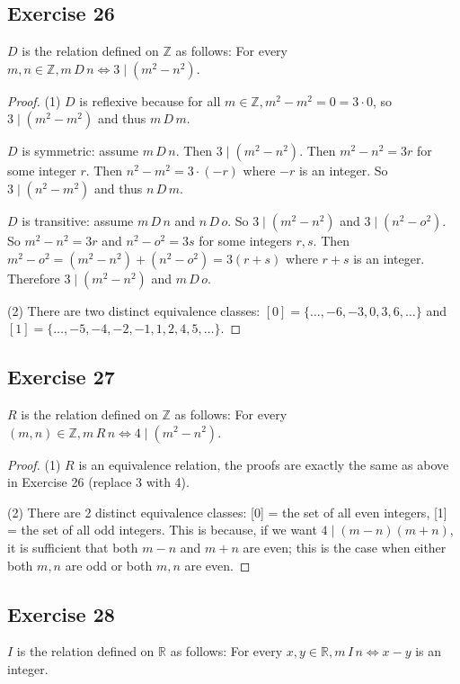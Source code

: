 \documentclass[14pt]{extarticle}
\newcommand{\R}{\mathbb{R}}
\newcommand{\Z}{\mathbb{Z}}
\begin{document}
\subsection{Exercise 26}
$D$ is the relation defined on \(\Z\) as follows: For every \(m, n \in \Z, m \,D\, n \iff 3 \mid (m^2 - n^2)\).

\begin{proof}
(1) \(D\) is reflexive because for all \(m \in \Z, m^2 - m^2 = 0 = 3 \cdot 0\), so \(3 \mid (m^2-m^2)\) and thus 
\(m \,D\, m\).

\(D\) is symmetric: assume \(m \,D\, n\). Then \(3 \mid (m^2 - n^2)\). Then \(m^2-n^2 = 3r\) for some integer $r$.
Then \(n^2-m^2 = 3\cdot(-r)\) where $-r$ is an integer. So \(3 \mid (n^2-m^2)\) and thus \(n \,D\, m\).

\(D\) is transitive: assume \(m \,D\, n\) and \(n \,D\, o\). So \(3 \mid (m^2-n^2)\) and \(3 \mid (n^2-o^2)\). So
\(m^2-n^2 = 3r\) and \(n^2-o^2 = 3s\) for some integers $r,s$. Then \(m^2-o^2 = (m^2-n^2)+(n^2-o^2) = 3(r+s)\) 
where $r+s$ is an integer. Therefore \(3 \mid (m^2-n^2)\) and \(m \,D\, o\).

(2) There are two distinct equivalence classes: \([0] = \{\ldots, -6, -3, 0, 3, 6, \ldots\}\) and 
\([1] = \{\ldots, -5, -4, -2, -1, 1, 2, 4, 5, \ldots\}\).
\end{proof}

\subsection{Exercise 27}
\(R\) is the relation defined on \(\Z\) as follows: For every \((m, n) \in \Z, m \,R\, n \iff 4 \mid (m^2 - n^2)\).

\begin{proof}
(1) $R$ is an equivalence relation, the proofs are exactly the same as above in Exercise 26 (replace 3 with 4).

(2) There are 2 distinct equivalence classes: [0] = the set of all even integers, [1] = the set of all odd integers.
This is because, if we want \(4 \mid (m-n)(m+n)\), it is sufficient that both \(m-n\) and \(m+n\) are even; this is 
the case when either both $m,n$ are odd or both $m,n$ are even.
\end{proof}

\subsection{Exercise 28}
$I$ is the relation defined on $\R$ as follows: For every \(x, y \in \R, m \,I\, n \iff x - y\) is an integer.
\end{document}
